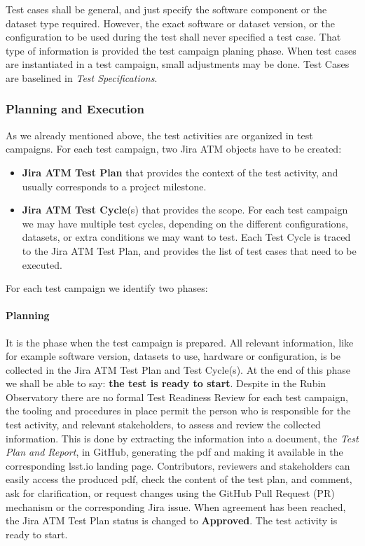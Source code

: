 Test cases shall be general, and just specify the software component or the dataset type required. 
However, the exact software or dataset version, or the configuration to be used during the test shall never specified a test case. 
That type of information is provided the test campaign planing phase.
When test cases are instantiated in a test campaign, small adjustments may be done.
Test Cases are baselined in \textit{Test Specifications}.

\subsubsection{Planning and Execution}

As we already mentioned above, the test activities are organized in test campaigns.
For each test campaign, two Jira ATM objects have to be created:

\begin{itemize}
\item \textbf{Jira ATM Test Plan} that provides the context of the test activity, and usually corresponds to a project milestone.
\item \textbf{Jira ATM Test Cycle}(s) that provides the scope. For each test campaign we may have multiple test cycles, 
depending on the different configurations, datasets, or extra conditions we may want to test. Each Test Cycle is traced
to the Jira ATM Test Plan, and provides the list of test cases that need to be executed.
\end{itemize}

For each test campaign we identify two phases:

\paragraph{Planning}
It is the phase when the test campaign is prepared. All relevant information, like for example software version, datasets to use, hardware or configuration, 
is be collected in the Jira ATM Test Plan and Test Cycle(s). 
At the end of this phase we shall be able to say: \textbf{the test is ready to start}.
Despite in the Rubin Observatory there are no formal Test Readiness Review for each test campaign, 
the tooling and procedures in place permit the person who is responsible for the test activity, and relevant stakeholders, to assess and review the collected information. 
This is done by extracting the information into a document, the \textit{Test Plan and Report}, in GitHub, generating the pdf and making it available
in the corresponding lsst.io landing page. Contributors, reviewers and stakeholders can easily access the produced pdf,
check the content of the test plan, and comment, ask for clarification, or request changes using the GitHub
Pull Request (PR) mechanism or the corresponding Jira issue.
When agreement has been reached, the Jira ATM Test Plan status is changed to \textbf{Approved}. The test activity is ready to start.

